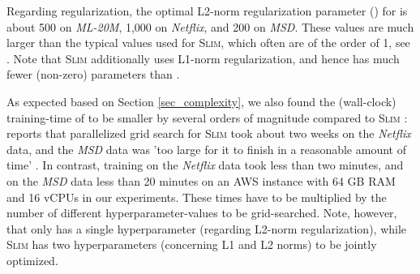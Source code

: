 \documentclass[sigconf]{acmart}
\newcommand{\slim}{{\scshape Slim}}
\newcommand{\sae}{}
\begin{document}
Regarding regularization,  the optimal L2-norm regularization parameter () for \sae{}   is about 500 on \emph{ML-20M}, 1,000 on \emph{Netflix}, and 200 on \emph{MSD}. These values are much larger than the typical values used for \slim{}, which often are of the order of 1, see \cite{ning11}. Note that \slim{} additionally uses L1-norm regularization, and hence has much fewer (non-zero) parameters than \sae.  

As expected based on Section \ref{sec_complexity}, we also found the (wall-clock) training-time of \sae{}  to be smaller by several orders of magnitude compared to \slim{} : \cite{liang18} reports that parallelized grid search for \slim{} took about two weeks on the \emph{Netflix} data, and the \emph{MSD} data was 'too large for it to finish in a reasonable amount of time' \cite{liang18}. In contrast,  training \sae{}  on the \emph{Netflix} data took less than two minutes, and on the  \emph{MSD} data less than 20 minutes on an AWS instance with 64 GB RAM and 16 vCPUs in our experiments. These times have to be multiplied by the number of different hyperparameter-values to be grid-searched.  Note, however, that \sae{}  only has a single hyperparameter (regarding L2-norm regularization), while \slim{} has two hyperparameters (concerning L1 and L2 norms) to be jointly optimized.
\end{document}
